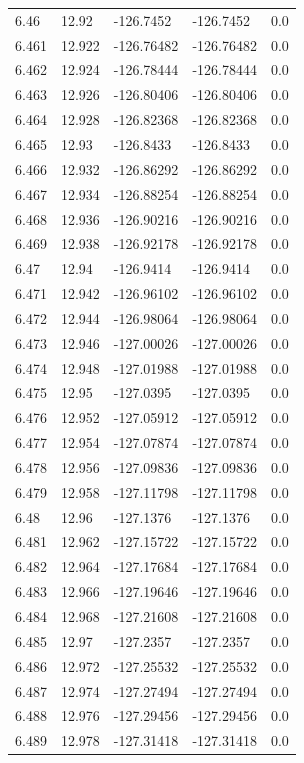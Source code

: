 \begin{tabular}{lllll}
6.46 & 12.92 & -126.7452 & -126.7452 & 0.0 \\
6.461 & 12.922 & -126.76482 & -126.76482 & 0.0 \\
6.462 & 12.924 & -126.78444 & -126.78444 & 0.0 \\
6.463 & 12.926 & -126.80406 & -126.80406 & 0.0 \\
6.464 & 12.928 & -126.82368 & -126.82368 & 0.0 \\
6.465 & 12.93 & -126.8433 & -126.8433 & 0.0 \\
6.466 & 12.932 & -126.86292 & -126.86292 & 0.0 \\
6.467 & 12.934 & -126.88254 & -126.88254 & 0.0 \\
6.468 & 12.936 & -126.90216 & -126.90216 & 0.0 \\
6.469 & 12.938 & -126.92178 & -126.92178 & 0.0 \\
6.47 & 12.94 & -126.9414 & -126.9414 & 0.0 \\
6.471 & 12.942 & -126.96102 & -126.96102 & 0.0 \\
6.472 & 12.944 & -126.98064 & -126.98064 & 0.0 \\
6.473 & 12.946 & -127.00026 & -127.00026 & 0.0 \\
6.474 & 12.948 & -127.01988 & -127.01988 & 0.0 \\
6.475 & 12.95 & -127.0395 & -127.0395 & 0.0 \\
6.476 & 12.952 & -127.05912 & -127.05912 & 0.0 \\
6.477 & 12.954 & -127.07874 & -127.07874 & 0.0 \\
6.478 & 12.956 & -127.09836 & -127.09836 & 0.0 \\
6.479 & 12.958 & -127.11798 & -127.11798 & 0.0 \\
6.48 & 12.96 & -127.1376 & -127.1376 & 0.0 \\
6.481 & 12.962 & -127.15722 & -127.15722 & 0.0 \\
6.482 & 12.964 & -127.17684 & -127.17684 & 0.0 \\
6.483 & 12.966 & -127.19646 & -127.19646 & 0.0 \\
6.484 & 12.968 & -127.21608 & -127.21608 & 0.0 \\
6.485 & 12.97 & -127.2357 & -127.2357 & 0.0 \\
6.486 & 12.972 & -127.25532 & -127.25532 & 0.0 \\
6.487 & 12.974 & -127.27494 & -127.27494 & 0.0 \\
6.488 & 12.976 & -127.29456 & -127.29456 & 0.0 \\
6.489 & 12.978 & -127.31418 & -127.31418 & 0.0 \\

\end{tabular}
